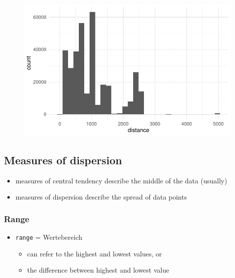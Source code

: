 \documentclass[
  letterpaper,
  DIV=11]{scrartcl}
\providecommand{\tightlist}{%
  \setlength{\itemsep}{0pt}\setlength{\parskip}{0pt}}\usepackage{longtable,booktabs,array}
\begin{document}
\begin{figure}[H]

{\centering \includegraphics{_descr_stats_EN_files/figure-pdf/unnamed-chunk-27-1.pdf}

}

\end{figure}

\hypertarget{measures-of-dispersion}{%
\subsection{Measures of dispersion}\label{measures-of-dispersion}}

\begin{itemize}
\tightlist
\item
  measures of central tendency describe the middle of the data (usually)
\item
  measures of dispersion describe the spread of data points
\end{itemize}

\hypertarget{range}{%
\subsubsection{Range}\label{range}}

\begin{itemize}
\tightlist
\item
  \texttt{range} = Wertebereich

  \begin{itemize}
  \tightlist
  \item
    can refer to the highest and lowest values, or
  \item
    the difference between highest and lowest value
  \end{itemize}
\end{itemize}
\end{document}
